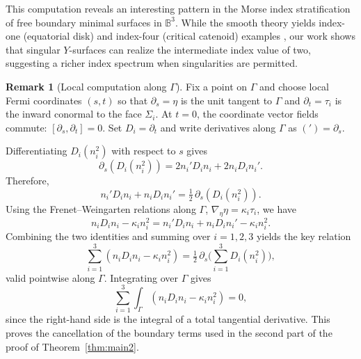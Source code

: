 \documentclass[11pt]{amsart}
\numberwithin{equation}{section}
\theoremstyle{theorem}
\theoremstyle{definition}
\newtheorem{remark}[theorem]{Remark}
\numberwithin{equation}{section}
\begin{document}
This computation reveals an interesting pattern in the Morse index stratification of free boundary minimal surfaces in $\mathbb{B}^3$. While the smooth theory yields index-one (equatorial disk) and index-four (critical catenoid) examples \cite{devyver2019index, tran2016index}, our work shows that singular $Y$-surfaces can realize the intermediate index value of two, suggesting a richer index spectrum when singularities are permitted.


\begin{remark}[Local computation along $\Gamma$]\label{rmk:local comp. on Gamma}
Fix a point on $\Gamma$ and choose local Fermi coordinates $(s,t)$ so that 
$\partial_s=\eta$ is the unit tangent to $\Gamma$ and $\partial_t=\tau_i$ is the inward conormal to the face $\Sigma_i$. 
At $t=0$, the coordinate vector fields commute: $[\partial_s,\partial_t]=0$. 
Set $D_i=\partial_t$ and write derivatives along $\Gamma$ as $('\!)=\partial_s$.

Differentiating $D_i(n_i^2)$ with respect to $s$ gives
\[
\partial_s(D_i(n_i^2)) = 2n_i' D_i n_i + 2n_i D_i n_i'.
\]
Therefore,
\[
n_i' D_i n_i + n_i D_i n_i' = \tfrac{1}{2}\,\partial_s(D_i(n_i^2)).
\]
Using the Frenet--Weingarten relations along $\Gamma$, 
$\nabla_\eta \eta = \kappa_i \tau_i$, 
we have
\[
n_i D_i n_i - \kappa_i n_i^2
= n_i' D_i n_i + n_i D_i n_i' - \kappa_i n_i^2.
\]
Combining the two identities and summing over $i=1,2,3$ yields the key relation
\[
\sum_{i=1}^3 (n_i D_i n_i - \kappa_i n_i^2)
= \tfrac{1}{2}\,\partial_s\!\Big(\sum_{i=1}^3 D_i(n_i^2)\Big),
\]
valid pointwise along $\Gamma$. 
Integrating over $\Gamma$ gives
\[
\sum_{i=1}^3 \int_\Gamma (n_i D_i n_i - \kappa_i n_i^2) = 0,
\]
since the right-hand side is the integral of a total tangential derivative. 
This proves the cancellation of the boundary terms used in the second part of the proof of Theorem~\ref{thm:main2}.
\end{remark}
\end{document}
